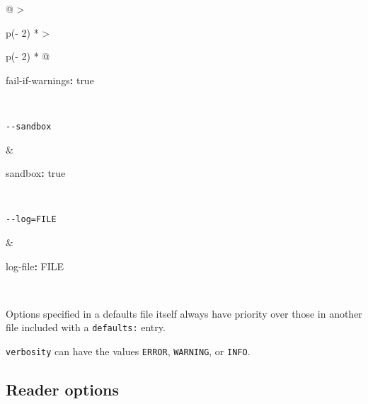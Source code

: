 \documentclass[
  a4paper,
]{article}
\newenvironment{Shaded}{}{}
\newcommand{\AttributeTok}[1]{\textcolor[rgb]{0.49,0.56,0.16}{#1}}
\newcommand{\CharTok}[1]{\textcolor[rgb]{0.25,0.44,0.63}{#1}}
\newcommand{\FunctionTok}[1]{\textcolor[rgb]{0.02,0.16,0.49}{#1}}
\newcommand{\KeywordTok}[1]{\textcolor[rgb]{0.00,0.44,0.13}{\textbf{#1}}}
\begin{document}
\begin{longtable}[]{@{}
  >{\raggedright\arraybackslash}p{(\columnwidth - 2\tabcolsep) * }
  >{\raggedright\arraybackslash}p{(\columnwidth - 2\tabcolsep) * }@{}}
\begin{minipage}[t]{\linewidth}
\begin{Shaded}
\begin{Highlighting}[]
\FunctionTok{fail{-}if{-}warnings}\KeywordTok{:}\AttributeTok{ }\CharTok{true}
\end{Highlighting}
\end{Shaded}
\end{minipage} \\
\begin{minipage}[t]{\linewidth}\raggedright
\begin{verbatim}
--sandbox
\end{verbatim}
\end{minipage} & \begin{minipage}[t]{\linewidth}\raggedright
\begin{Shaded}
\begin{Highlighting}[]
\FunctionTok{sandbox}\KeywordTok{:}\AttributeTok{ }\CharTok{true}
\end{Highlighting}
\end{Shaded}
\end{minipage} \\
\begin{minipage}[t]{\linewidth}\raggedright
\begin{verbatim}
--log=FILE
\end{verbatim}
\end{minipage} & \begin{minipage}[t]{\linewidth}\raggedright
\begin{Shaded}
\begin{Highlighting}[]
\FunctionTok{log{-}file}\KeywordTok{:}\AttributeTok{ FILE}
\end{Highlighting}
\end{Shaded}
\end{minipage} \\
\end{longtable}

Options specified in a defaults file itself always have priority over
those in another file included with a \texttt{defaults:} entry.

\texttt{verbosity} can have the values \texttt{ERROR}, \texttt{WARNING},
or \texttt{INFO}.

\hypertarget{reader-options-1}{%
\subsection{Reader options}\label{reader-options-1}}
\end{document}
